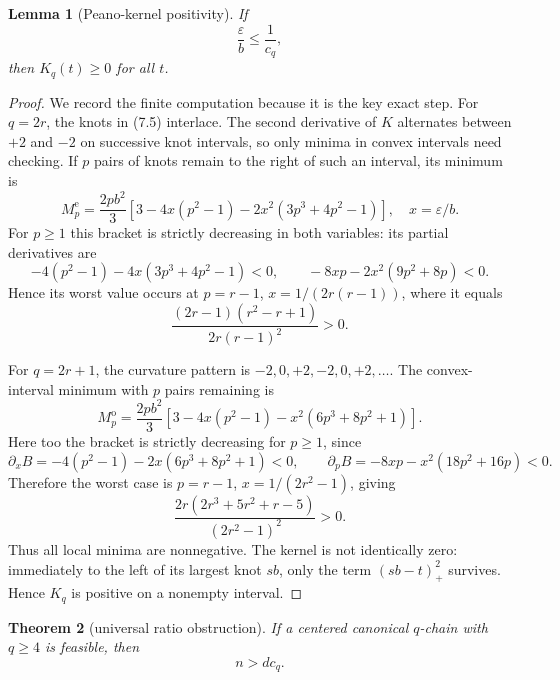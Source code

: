 \documentclass[11pt]{article}
\newtheorem{theorem}{Theorem}[section]
\newtheorem{lemma}[theorem]{Lemma}
\theoremstyle{remark}
\begin{document}
\begin{lemma}[Peano-kernel positivity]\label{lem:peano}
If
\[
\frac{\varepsilon}{b}\le\frac1{c_q},
\]
then $K_q(t)\ge0$ for all $t$.
\end{lemma}

\begin{proof}
We record the finite computation because it is the key exact step. For $q=2r$, the knots in (7.5) interlace. The second derivative of $K$ alternates between $+2$ and $-2$ on successive knot intervals, so only minima in convex intervals need checking. If $p$ pairs of knots remain to the right of such an interval, its minimum is
\[
M_p^{\mathrm e}=\frac{2pb^2}{3}
\left[3-4x(p^2-1)-2x^2(3p^3+4p^2-1)\right],
\quad x=\varepsilon/b.
\]
For $p\ge1$ this bracket is strictly decreasing in both variables: its partial derivatives are
\[
-4(p^2-1)-4x(3p^3+4p^2-1)<0,
\qquad
-8xp-2x^2(9p^2+8p)<0.
\]
Hence its worst value occurs at $p=r-1$, $x=1/(2r(r-1))$, where it equals
\[
\frac{(2r-1)(r^2-r+1)}{2r(r-1)^2}>0.
\]

For $q=2r+1$, the curvature pattern is $-2,0,+2,-2,0,+2,\dots$. The convex-interval minimum with $p$ pairs remaining is
\[
M_p^{\mathrm o}=\frac{2pb^2}{3}
\left[3-4x(p^2-1)-x^2(6p^3+8p^2+1)\right].
\]
Here too the bracket is strictly decreasing for $p\ge1$, since
\[
\partial_x B=-4(p^2-1)-2x(6p^3+8p^2+1)<0,
\qquad
\partial_p B=-8xp-x^2(18p^2+16p)<0.
\]
Therefore the worst case is $p=r-1$, $x=1/(2r^2-1)$, giving
\[
\frac{2r(2r^3+5r^2+r-5)}{(2r^2-1)^2}>0.
\]
Thus all local minima are nonnegative. The kernel is not identically zero: immediately to the left of its largest knot $sb$, only the term $(sb-t)_+^2$ survives. Hence $K_q$ is positive on a nonempty interval.
\end{proof}

\begin{theorem}[universal ratio obstruction]\label{thm:ratio}
If a centered canonical $q$-chain with $q\ge4$ is feasible, then
\[
\boxed{n>dc_q.}\tag{7.7}
\]
\end{theorem}
\end{document}

